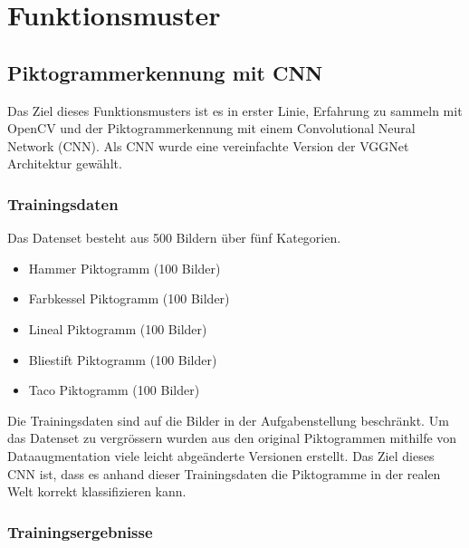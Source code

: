 \section{Funktionsmuster}
\subsection{Piktogrammerkennung mit CNN}
Das Ziel dieses Funktionsmusters ist es in erster Linie, Erfahrung zu sammeln mit OpenCV und der Piktogrammerkennung mit einem Convolutional Neural Network (CNN). Als CNN wurde eine vereinfachte Version der VGGNet Architektur gewählt.

\subsubsection{Trainingsdaten}
Das Datenset besteht aus 500 Bildern über fünf Kategorien.
\begin{itemize}
    \item Hammer Piktogramm (100 Bilder)
    \item Farbkessel Piktogramm (100 Bilder)
    \item Lineal Piktogramm (100 Bilder)
    \item Bliestift Piktogramm (100 Bilder)
    \item Taco Piktogramm (100 Bilder)
 \end{itemize}
 
Die Trainingsdaten sind auf die Bilder in der Aufgabenstellung beschränkt. Um das Datenset zu vergrössern wurden aus den original Piktogrammen mithilfe von Dataaugmentation viele leicht abgeänderte Versionen erstellt. Das Ziel dieses CNN ist, dass es anhand dieser Trainingsdaten die Piktogramme in der realen Welt korrekt klassifizieren kann.

\subsubsection{Trainingsergebnisse}
